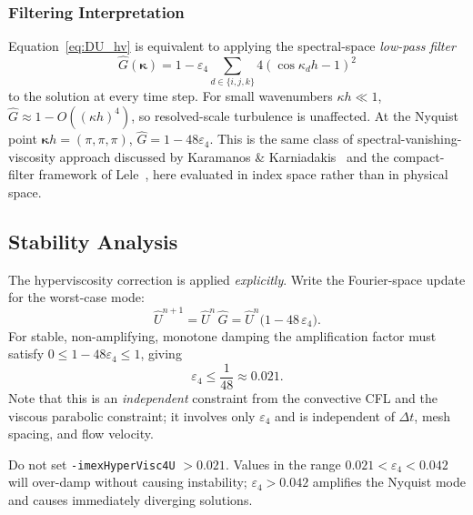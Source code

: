 \documentclass[12pt,a4paper]{article}
\newcommand{\dt}{\Delta t}
\begin{document}
	\subsubsection{Filtering Interpretation}

	Equation~\eqref{eq:DU_hv} is equivalent to applying the spectral-space
	\emph{low-pass filter}
	\begin{equation}
		\widehat{G}(\bm{\kappa})
		= 1 - \varepsilon_4
		\sum_{d\in\{i,j,k\}} 4(\cos\kappa_d h - 1)^2
		\label{eq:filter}
	\end{equation}
	to the solution at every time step. For small wavenumbers
	$\kappa h \ll 1$, $\widehat{G} \approx 1 - O((\kappa h)^4)$, so
	resolved-scale turbulence is unaffected. At the Nyquist point
	$\bm{\kappa}h = (\pi,\pi,\pi)$, $\widehat{G} = 1 - 48\varepsilon_4$.
	This is the same class of spectral-vanishing-viscosity
	approach discussed by Karamanos \& Karniadakis~\cite{Karamanos2000}
	and the compact-filter framework of Lele~\cite{Lele1992}, here
	evaluated in index space rather than in physical space.

	\subsection{Stability Analysis}
	\label{sec:hypervisc:stability}

	The hyperviscosity correction is applied \emph{explicitly}.
	Write the Fourier-space update for the worst-case mode:
	\begin{equation}
		\hat{U}^{n+1} = \hat{U}^n\,\widehat{G} = \hat{U}^n
		\bigl(1 - 48\,\varepsilon_4\bigr).
	\end{equation}
	For stable, non-amplifying, monotone damping the amplification factor
	must satisfy $0 \leq 1 - 48\varepsilon_4 \leq 1$, giving
	\begin{equation}
		\boxed{\varepsilon_4 \leq \frac{1}{48} \approx 0.021.}
		\label{eq:stability}
	\end{equation}
	Note that this is an \emph{independent} constraint from the convective
	CFL and the viscous parabolic constraint; it involves only $\varepsilon_4$
	and is independent of $\dt$, mesh spacing, and flow velocity.

	\begin{warnbox}
		Do not set \texttt{-imexHyperVisc4U} $> 0.021$.
		Values in the range $0.021 < \varepsilon_4 < 0.042$
		will over-damp without causing instability;
		$\varepsilon_4 > 0.042$ amplifies the Nyquist mode and causes
		immediately diverging solutions.
	\end{warnbox}
\end{document}

